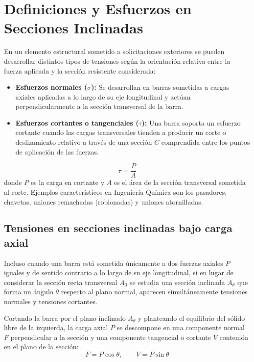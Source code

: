 \section{Definiciones y Esfuerzos en Secciones Inclinadas}

En un elemento estructural sometido a solicitaciones exteriores se pueden desarrollar distintos tipos de tensiones según la orientación relativa entre la fuerza aplicada y la sección resistente considerada:
\begin{itemize}
    \item \textbf{Esfuerzos normales ($\sigma$):} Se desarrollan en barras sometidas a cargas axiales aplicadas a lo largo de su eje longitudinal y actúan perpendicularmente a la sección transversal de la barra.
    \item \textbf{Esfuerzos cortantes o tangenciales ($\tau$):} Una barra soporta un esfuerzo cortante cuando las cargas transversales tienden a producir un corte o deslizamiento relativo a través de una sección $C$ comprendida entre los puntos de aplicación de las fuerzas.
\end{itemize}

\begin{equation}
    \tau = \frac{P}{A}
    \label{eq:t8_tau_media}
\end{equation}
donde $P$ es la carga en cortante y $A$ es el área de la sección transversal sometida al corte. Ejemplos característicos en Ingeniería Química son los pasadores, chavetas, uniones remachadas (roblonadas) y uniones atornilladas.

\subsection{Tensiones en secciones inclinadas bajo carga axial}
Incluso cuando una barra está sometida únicamente a dos fuerzas axiales $P$ iguales y de sentido contrario a lo largo de su eje longitudinal, si en lugar de considerar la sección recta transversal $A_0$ se estudia una sección inclinada $A_\theta$ que forma un ángulo $\theta$ respecto al plano normal, aparecen simultáneamente tensiones normales y tensiones cortantes.

Cortando la barra por el plano inclinado $A_\theta$ y planteando el equilibrio del sólido libre de la izquierda, la carga axial $P$ se descompone en una componente normal $F$ perpendicular a la sección y una componente tangencial o cortante $V$ contenida en el plano de la sección:
\begin{equation}
    F = P \cos\theta, \qquad V = P \sin\theta
    \label{eq:t8_decomp_FV}
\end{equation}

